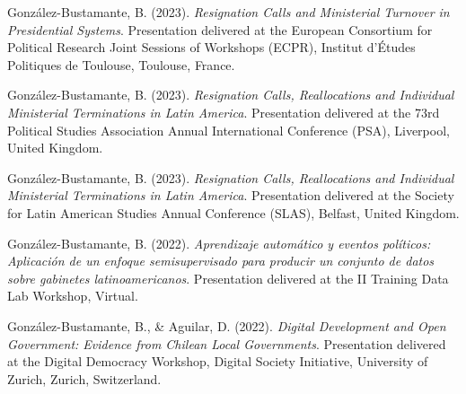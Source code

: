 \begin{publications}
\begin{benumerate}{87}
\item{González-Bustamante, B. (2023). {\itshape Resignation Calls and Ministerial Turnover in Presidential Systems}. Presentation delivered at the European Consortium for Political Research Joint Sessions of Workshops (ECPR), Institut d'Études Politiques de Toulouse, Toulouse, France.}\vspace{1mm}

\item{González-Bustamante, B. (2023). {\itshape Resignation Calls, Reallocations and Individual Ministerial Terminations in Latin America}. Presentation delivered at the 73rd Political Studies Association Annual International Conference (PSA), Liverpool, United Kingdom.}\vspace{1mm}

\item{González-Bustamante, B. (2023). {\itshape Resignation Calls, Reallocations and Individual Ministerial Terminations in Latin America}. Presentation delivered at the Society for Latin American Studies Annual Conference (SLAS), Belfast, United Kingdom.}\vspace{1mm}


\item{González-Bustamante, B. (2022). {\itshape Aprendizaje automático y eventos políticos: Aplicación de un enfoque semisupervisado para producir un conjunto de datos sobre gabinetes latinoamericanos}. Presentation delivered at the II Training Data Lab Workshop, Virtual.}\vspace{1mm}

\item{González-Bustamante, B., \& Aguilar, D. (2022). {\itshape Digital Development and Open Government: Evidence from Chilean Local Governments}. Presentation delivered at the Digital Democracy Workshop, Digital Society Initiative, University of Zurich, Zurich, Switzerland.}\vspace{1mm}



\end{benumerate}
\end{publications}
